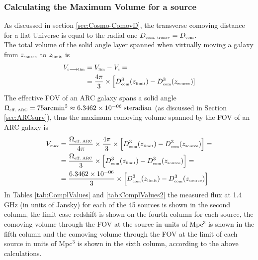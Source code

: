 \subsubsection*{Calculating the Maximum Volume for a source}
As discussed in section \ref{sec:Cosmo-ComovD}, the transverse comoving distance for a flat Universe is equal to the radial one $ D_{\mbox{\tiny{com, transv}}}  = D_{\mbox{\tiny{com}}}$.\\ 
The total volume of the solid angle layer spanned when virtually moving a galaxy from $z_{\mbox{\tiny{source}}}$ to $z_{\mbox{\tiny{limit}}}$ is 
\begin{equation}
\begin{aligned}
    V_{\mbox{\tiny{s}} \longrightarrow \mbox{\tiny{lim}}} &= V_{\mbox{\tiny{lim}}} - V_{\mbox{\tiny{s}}}=  \\ 
    & = \dfrac{4\pi}{3} \times \Big[ D^3_{\mbox{\tiny{com}}} (z_{\mbox{\tiny{limit}}} ) -  D^3_{\mbox{\tiny{com}}} (z_{\mbox{\tiny{source}}} )] 
\end{aligned} 
\label{eq:Volume_tot}
\end{equation}
The effective FOV of an ARC galaxy spans a solid angle $\Omega_{\mbox{\tiny{eff, ARC}}} = 75 \mbox{arcmin}^2 \approx 6.3462 \times 10^{-06}\; \mbox{steradian}$ (as discussed in Section \ref{sec:ARCsurv}), thus the maximum comoving volume spanned by the FOV of an ARC galaxy is
\begin{equation}
\begin{aligned}
    V_{\mbox{\tiny{max}}}  & = \dfrac{\Omega_{\mbox{\tiny{eff, ARC}}} }{4\pi}  \times \dfrac{4\pi}{3} \times \Big[ D^3_{\mbox{\tiny{com}}} (z_{\mbox{\tiny{limit}}} ) -  D^3_{\mbox{\tiny{com}}} (z_{\mbox{\tiny{source}}} )\Big] =\\
    & = \dfrac{\Omega_{\mbox{\tiny{eff, ARC}}} }{3} \times \Big[ D^3_{\mbox{\tiny{com}}} (z_{\mbox{\tiny{limit}}} ) -  D^3_{\mbox{\tiny{com}}} (z_{\mbox{\tiny{source}}} )\Big] =\\
    & = \dfrac{6.3462 \times 10^{-06}}{3} \times \Big[ D^3_{\mbox{\tiny{com}}} (z_{\mbox{\tiny{limit}}} ) -  D^3_{\mbox{\tiny{com}}} (z_{\mbox{\tiny{source}}} )\Big]
\end{aligned} 
\label{eq:Volume_max}
\end{equation}
In Tables \ref{tab:ComplValues} and \ref{tab:ComplValues2}  the measured flux at 1.4 GHz (in units of Jansky) for each of the 45 sources is shown in the second column, the limit case redshift is shown on the fourth column for each source, the comoving volume through the FOV at the source in units of Mpc$^3$ is shown in the fifth column and the comoving volume through the FOV at the limit of each source in units of Mpc$^3$  is shown in the sixth column, according to the above calculations. 
